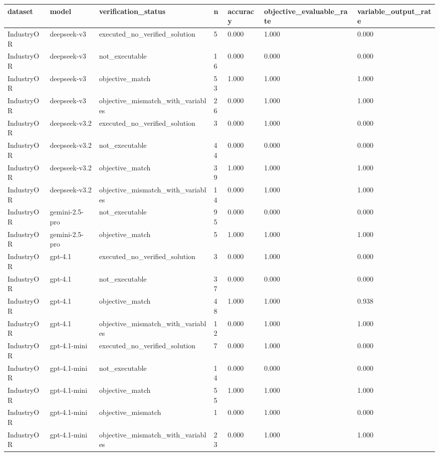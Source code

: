 \begin{table}[t]
\centering
\small
\begin{tabular}{lllllll}
\toprule
dataset & model & verification\_status & n & accuracy & objective\_evaluable\_rate & variable\_output\_rate \\
\midrule
IndustryOR & deepseek-v3 & executed\_no\_verified\_solution & 5 & 0.000 & 1.000 & 0.000 \\
IndustryOR & deepseek-v3 & not\_executable & 16 & 0.000 & 0.000 & 0.000 \\
IndustryOR & deepseek-v3 & objective\_match & 53 & 1.000 & 1.000 & 1.000 \\
IndustryOR & deepseek-v3 & objective\_mismatch\_with\_variables & 26 & 0.000 & 1.000 & 1.000 \\
IndustryOR & deepseek-v3.2 & executed\_no\_verified\_solution & 3 & 0.000 & 1.000 & 0.000 \\
IndustryOR & deepseek-v3.2 & not\_executable & 44 & 0.000 & 0.000 & 0.000 \\
IndustryOR & deepseek-v3.2 & objective\_match & 39 & 1.000 & 1.000 & 1.000 \\
IndustryOR & deepseek-v3.2 & objective\_mismatch\_with\_variables & 14 & 0.000 & 1.000 & 1.000 \\
IndustryOR & gemini-2.5-pro & not\_executable & 95 & 0.000 & 0.000 & 0.000 \\
IndustryOR & gemini-2.5-pro & objective\_match & 5 & 1.000 & 1.000 & 1.000 \\
IndustryOR & gpt-4.1 & executed\_no\_verified\_solution & 3 & 0.000 & 1.000 & 0.000 \\
IndustryOR & gpt-4.1 & not\_executable & 37 & 0.000 & 0.000 & 0.000 \\
IndustryOR & gpt-4.1 & objective\_match & 48 & 1.000 & 1.000 & 0.938 \\
IndustryOR & gpt-4.1 & objective\_mismatch\_with\_variables & 12 & 0.000 & 1.000 & 1.000 \\
IndustryOR & gpt-4.1-mini & executed\_no\_verified\_solution & 7 & 0.000 & 1.000 & 0.000 \\
IndustryOR & gpt-4.1-mini & not\_executable & 14 & 0.000 & 0.000 & 0.000 \\
IndustryOR & gpt-4.1-mini & objective\_match & 55 & 1.000 & 1.000 & 1.000 \\
IndustryOR & gpt-4.1-mini & objective\_mismatch & 1 & 0.000 & 1.000 & 0.000 \\
IndustryOR & gpt-4.1-mini & objective\_mismatch\_with\_variables & 23 & 0.000 & 1.000 & 1.000 \\

\end{tabular}
\end{table}
